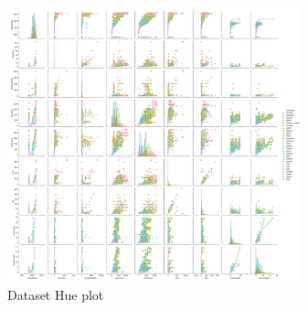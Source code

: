 \documentclass[conference]{IEEEtran}
\begin{document}
	\begin{figure}[H]
	\centerline{\includegraphics[width=85mm,scale=1]{DataPariPlot.png}}
	\caption{Dataset Hue plot}
	\label{DataPariPlot}
\end{figure}
\end{document}
